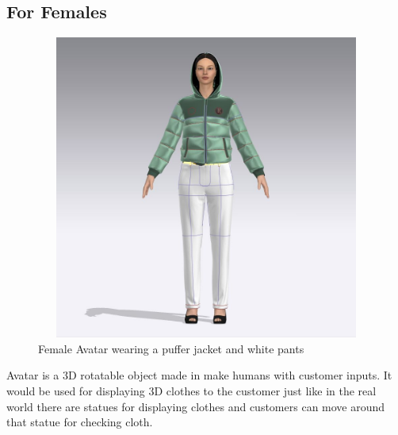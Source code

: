 \subsection{For Females}
\begin{figure}[H]
    \centering
    \includegraphics[width=12cm,height=10cm]{Figures/3DAvatars/female1.jpeg}
    \caption{Female Avatar wearing a puffer jacket and white pants}
    \label{Female Avatar wearing a puffer jacket and white pants}
    
\end{figure}
\justifying
Avatar is a 3D rotatable object made in make humans with customer inputs. It would be used for displaying 3D clothes to the customer just like in the real world there are statues for displaying clothes and customers can move around that statue for checking cloth.  


